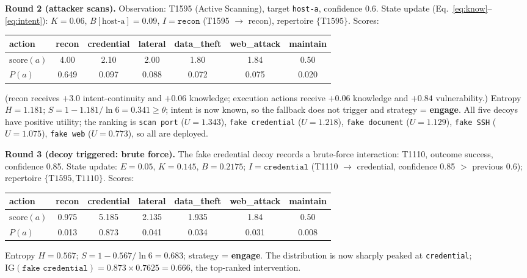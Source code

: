 \documentclass[11pt]{article}
\newcommand{\act}[1]{\texttt{#1}}
\begin{document}
\textbf{Round 2 (attacker scans).} Observation: T1595 (Active Scanning),
target \act{host-a}, confidence 0.6. State update
(Eq.~\ref{eq:know}--\ref{eq:intent}): $K = 0.06$, $B[\text{host-a}] = 0.09$,
$I = \act{recon}$ (T1595 $\to$ recon), repertoire $\{\text{T1595}\}$.
Scores:
\begin{center}
\begin{adjustbox}{max width=\linewidth}\begin{tabular}{lcccccc}
\toprule
action & recon & credential & lateral & data\_theft & web\_attack & maintain \\
\midrule
$\mathrm{score}(a)$ & 4.00 & 2.10 & 2.00 & 1.80 & 1.84 & 0.50 \\
$P(a)$ & 0.649 & 0.097 & 0.088 & 0.072 & 0.075 & 0.020 \\
\bottomrule
\end{tabular}\end{adjustbox}
\end{center}
(recon receives $+3.0$ intent-continuity and $+0.06$ knowledge; execution
actions receive $+0.06$ knowledge and $+0.84$ vulnerability.) Entropy
$H = 1.181$; $S = 1 - 1.181/\ln 6 = 0.341 \geq \theta$; intent is now
known, so the fallback does not trigger and strategy =
\textbf{engage}. All five decoys have positive utility; the ranking is
\act{scan port} ($U=1.343$), \act{fake credential} ($U=1.218$), \act{fake
document} ($U=1.129$), \act{fake SSH} ($U=1.075$), \act{fake web}
($U=0.773$), so all are deployed.

\textbf{Round 3 (decoy triggered: brute force).} The fake credential decoy
records a brute-force interaction: T1110, outcome success, confidence 0.85.
State update: $E = 0.05$, $K = 0.145$, $B = 0.2175$; $I = \act{credential}$
(T1110 $\to$ credential, confidence 0.85 $>$ previous 0.6); repertoire
$\{\text{T1595}, \text{T1110}\}$. Scores:
\begin{center}
\begin{adjustbox}{max width=\linewidth}\begin{tabular}{lcccccc}
\toprule
action & recon & credential & lateral & data\_theft & web\_attack & maintain \\
\midrule
$\mathrm{score}(a)$ & 0.975 & 5.185 & 2.135 & 1.935 & 1.84 & 0.50 \\
$P(a)$ & 0.013 & 0.873 & 0.041 & 0.034 & 0.031 & 0.008 \\
\bottomrule
\end{tabular}\end{adjustbox}
\end{center}
Entropy $H = 0.567$; $S = 1 - 0.567/\ln 6 = 0.683$; strategy =
\textbf{engage}. The distribution is now sharply peaked at
\act{credential}; $\mathrm{IG}(\act{fake credential}) = 0.873 \times
0.7625 = 0.666$, the top-ranked intervention.
\end{document}
